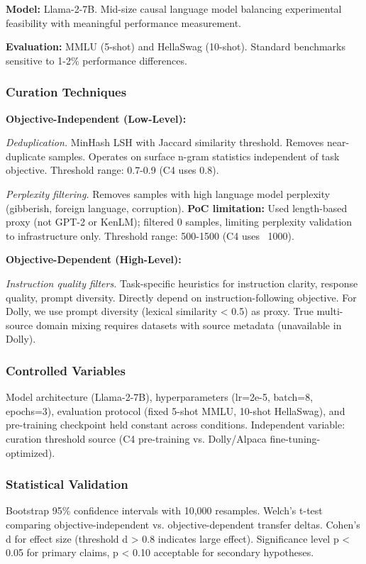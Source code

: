 \textbf{Model:} Llama-2-7B. Mid-size causal language model balancing experimental feasibility with meaningful performance measurement.

\textbf{Evaluation:} MMLU (5-shot) and HellaSwag (10-shot). Standard benchmarks sensitive to 1-2\% performance differences.

\subsubsection{Curation Techniques}

\textbf{Objective-Independent (Low-Level):}

\textit{Deduplication.} MinHash LSH with Jaccard similarity threshold. Removes near-duplicate samples. Operates on surface n-gram statistics independent of task objective. Threshold range: 0.7-0.9 (C4 uses 0.8).

\textit{Perplexity filtering.} Removes samples with high language model perplexity (gibberish, foreign language, corruption). \textbf{PoC limitation:} Used length-based proxy (not GPT-2 or KenLM); filtered 0 samples, limiting perplexity validation to infrastructure only. Threshold range: 500-1500 (C4 uses ~1000).

\textbf{Objective-Dependent (High-Level):}

\textit{Instruction quality filters.} Task-specific heuristics for instruction clarity, response quality, prompt diversity. Directly depend on instruction-following objective. For Dolly, we use prompt diversity (lexical similarity < 0.5) as proxy. True multi-source domain mixing requires datasets with source metadata (unavailable in Dolly).

\subsubsection{Controlled Variables}

Model architecture (Llama-2-7B), hyperparameters (lr=2e-5, batch=8, epochs=3), evaluation protocol (fixed 5-shot MMLU, 10-shot HellaSwag), and pre-training checkpoint held constant across conditions. Independent variable: curation threshold source (C4 pre-training vs. Dolly/Alpaca fine-tuning-optimized).

\subsubsection{Statistical Validation}

Bootstrap 95\% confidence intervals with 10,000 resamples. Welch's t-test comparing objective-independent vs. objective-dependent transfer deltas. Cohen's d for effect size (threshold d > 0.8 indicates large effect). Significance level p < 0.05 for primary claims, p < 0.10 acceptable for secondary hypotheses.

